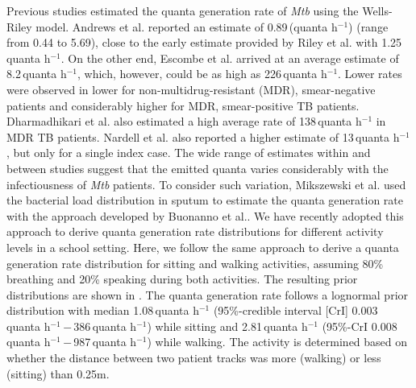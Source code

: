 \documentclass[fleqn,11pt]{wlscirep_supp}
\begin{document}
Previous studies estimated the quanta generation rate of \emph{Mtb} using the Wells-Riley model\cite{Andrews2014JID,Riley1962ARRD,Escombe2008PLoSMed,Nardell1991ARRD,Dharmadhikari2012AJRCCM}. Andrews et al.\cite{Andrews2014JID} reported an estimate of 0.89\,(quanta h$^{-1}$) (range from 0.44 to 5.69), close to the early estimate provided by Riley et al.\cite{Riley1962ARRD} with 1.25\,quanta h$^{-1}$. On the other end, Escombe et al.\cite{Escombe2008PLoSMed} arrived at an average estimate of 8.2\,quanta h$^{-1}$, which, however, could be as high as 226\,quanta h$^{-1}$. Lower rates were observed in lower for non-multidrug-resistant (MDR), smear-negative patients and considerably higher for MDR, smear-positive TB patients\cite{Escombe2008PLoSMed}. Dharmadhikari et al.\cite{Dharmadhikari2012AJRCCM} also estimated a high average rate of 138\,quanta h$^{-1}$ in MDR TB patients. Nardell et al.\cite{Nardell1991ARRD} also reported a higher estimate of 13\,quanta h$^{-1}$, but only for a single index case. The wide range of estimates within and between studies suggest that the emitted quanta varies considerably with the infectiousness of \emph{Mtb} patients\cite{Wurie2016BMJ}. To consider such variation, Mikszewski et al.\cite{Mikszewski2021GF} used the bacterial load distribution in sputum to estimate the quanta generation rate with the approach developed by Buonanno et al.\cite{Buonanno2020EI}. We have recently adopted this approach to derive quanta generation rate distributions for different activity levels in a school setting\cite{Banholzer2024PGPH}. Here, we follow the same approach to derive a quanta generation rate distribution for sitting and walking activities, assuming 80\% breathing and 20\% speaking during both activities. The resulting prior distributions are shown in . The quanta generation rate follows a lognormal prior distribution with median 1.08\,quanta h$^{-1}$ (95\%-credible interval [CrI] 0.003\,quanta h$^{-1}$\,$-$\,386\,quanta h$^{-1}$) while sitting and 2.81\,quanta h$^{-1}$ (95\%-CrI 0.008\,quanta h$^{-1}$\,$-$\,987\,quanta h$^{-1}$) while walking. The activity is determined based on whether the distance between two patient tracks was more (walking) or less (sitting) than 0.25m. 
\end{document}

